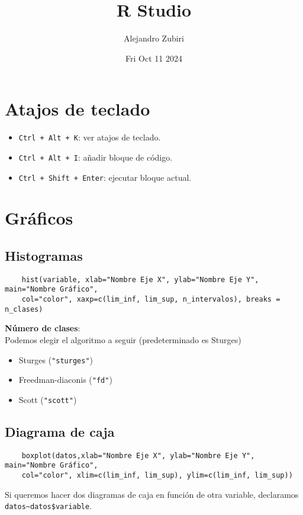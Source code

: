 \documentclass{article}
\author{Alejandro Zubiri}
\date{Fri Oct 11 2024}
\title{R Studio}
\begin{document}
\maketitle
\section{Atajos de teclado}
\begin{itemize}
    \item \verb|Ctrl + Alt + K|: ver atajos de teclado.
    \item \verb|Ctrl + Alt + I|: añadir bloque de código.
    \item \verb|Ctrl + Shift + Enter|: ejecutar bloque actual.
\end{itemize}
\section{Gráficos}
\subsection{Histogramas}
\begin{verbatim}
    hist(variable, xlab="Nombre Eje X", ylab="Nombre Eje Y", main="Nombre Gráfico",
    col="color", xaxp=c(lim_inf, lim_sup, n_intervalos), breaks = n_clases)
\end{verbatim}
\textbf{Número de clases}:\\
Podemos elegir el algoritmo a seguir (predeterminado es Sturges)
\begin{itemize}
    \item Sturges (\verb|"sturges"|)
    \item Freedman-diaconis (\verb|"fd"|)
    \item Scott (\verb|"scott"|)
\end{itemize}
\subsection{Diagrama de caja}
\begin{verbatim}
    boxplot(datos,xlab="Nombre Eje X", ylab="Nombre Eje Y", main="Nombre Gráfico",
    col="color", xlim=c(lim_inf, lim_sup), ylim=c(lim_inf, lim_sup))
\end{verbatim}
Si queremos hacer dos diagramas de caja en función de otra variable, declaramos \verb|datos~datos$variable|.
\end{document}
